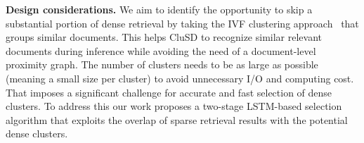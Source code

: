 

\label{sec:clusd}

{\bf Design considerations.}
We aim to identify the opportunity to skip a substantial portion of dense retrieval
by taking the IVF clustering approach~\cite{johnson2019billion} that  groups similar documents.
This  helps CluSD to recognize similar relevant documents during inference while avoiding the
need of a document-level proximity graph. The number of clusters needs to be as large as possible (meaning a small size per cluster) to avoid unnecessary I/O and computing cost. That imposes a significant challenge for accurate and fast selection of dense clusters.
To address this  our work proposes a two-stage LSTM-based 
selection algorithm that exploits the overlap of sparse retrieval results 
with the potential dense clusters.
